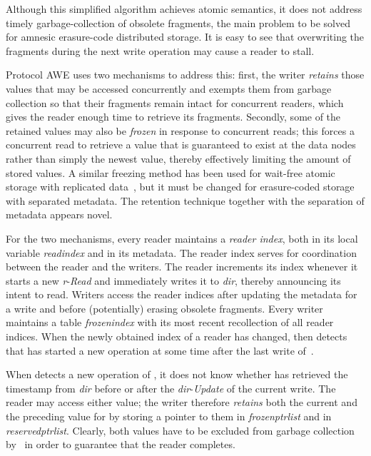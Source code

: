 \documentclass[oribibl]{llncs}
\theoremstyle{definition-boldhead}
\newcommand{\var}[1]{\textit{#1}}
\newcommand{\op}[1]{\textsl{#1}}
\newcommand{\dir}{\var{dir}\xspace}
\newcommand{\NAME}{AWE\xspace}
\newcommand{\nodes}{nodes\xspace}
\begin{document}
Although this simplified algorithm achieves atomic semantics, it does
not address timely garbage-collection of obsolete fragments, the main
problem to be solved for amnesic erasure-code distributed storage.
It is easy to see that overwriting the fragments during the next write
operation may cause a reader to stall.




Protocol \NAME uses two mechanisms to address this: first, the writer
\emph{retains} those values that may be accessed concurrently and
exempts them from garbage collection so that their fragments remain
intact for concurrent readers, which gives the reader enough time to
retrieve its fragments. Secondly, some of the retained values may also
be \emph{frozen} in response to concurrent reads; this forces a
concurrent read to retrieve a value that is guaranteed to exist at the
data \nodes rather than simply the newest value, thereby effectively
limiting the amount of stored values. A similar freezing method has
been used for wait-free atomic storage with replicated
data~\cite{gulevu06,domasu08}, but it must be changed for
erasure-coded storage with separated metadata.  The retention
technique together with the separation of metadata appears novel.

For the two mechanisms, every reader maintains a \emph{reader index}, both in its
local variable \var{readindex} and in its metadata. The reader index serves for
coordination between the reader and the writers. The reader increments its index
whenever it starts a new \var{r}-\op{Read} and immediately writes it to \dir, thereby
announcing its intent to read. Writers access the reader indices after updating
the metadata for a write and before (potentially) erasing obsolete fragments.
Every writer  maintains a table \var{frozenindex} with its most
recent recollection of all reader indices. When the newly obtained index of a
reader  has changed, then  detects that  has started a new operation
at some time after the last write of~.

When  detects a new operation of , it does not know whether  has
retrieved the timestamp from \dir before or after the \dir-\op{Update} of the
current write. The reader may access either value; the writer therefore
\emph{retains} both the current and the preceding value for
 by storing a pointer to them in \var{frozenptrlist} and in
\var{reservedptrlist}.
Clearly, both values have to be excluded from garbage collection by~
in order to guarantee that the reader completes.
\end{document}

